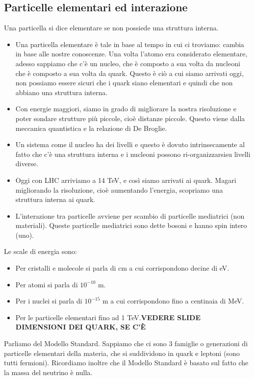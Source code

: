 \subsection{Particelle elementari ed interazione}
Una particella si dice elementare se non possiede una struttura interna. 
\begin{itemize}
    \item Una particella elementare è tale in base al tempo in cui ci troviamo: cambia in base alle nostre conoscenze. Una volta l'atomo era considerato elementare, adesso sappiamo che c'è un nucleo, che è composto a sua volta da nucleoni che è composto a sua volta da quark. Questo è ciò a cui siamo arrivati oggi, non possiamo essere sicuri che i quark siano elementari e quindi che non abbiano una struttura interna.
    \item Con energie maggiori, siamo in grado di migliorare la nostra risoluzione e poter sondare strutture più piccole, cioè distanze piccole. Questo viene dalla meccanica quantistica e la relazione di De Broglie. 
    \item Un sistema come il nucleo ha dei livelli e questo è dovuto intrinsecamente al fatto che c'è una struttura interna e i nucleoni possono ri-organizzarsisu livelli diverse.
    \item Oggi con LHC arriviamo a 14 TeV, e così siamo arrivati ai quark. Magari migliorando la risoluzione, cioè aumentando l'energia, scopriamo una struttura interna ai quark.
    \item L'interazione tra particelle avviene per scambio di particelle mediatrici (non materiali). Queste particelle mediatrici sono dette bosoni e hanno spin intero (uno).
\end{itemize}
Le scale di energia sono:
\begin{itemize}
    \item Per cristalli e molecole si parla di cm a cui corrispondono decine di eV.
    \item Per atomi si parla di $10^{-10}$ m.
    \item Per i nuclei si parla di $10^{-15}$ m a cui corrispondono fino a centinaia di MeV.
    \item Per le particelle elementari fino ad 1 TeV.\textbf{VEDERE SLIDE DIMENSIONI DEI QUARK, SE C'È}
\end{itemize}
Parliamo del Modello Standard. Sappiamo che ci sono 3 famiglie o generazioni di particelle elementari della materia, che si suddividono in quark e leptoni (sono tutti fermioni). Ricordiamo inoltre che il Modello Standard è basato sul fatto che la massa del neutrino è nulla.
